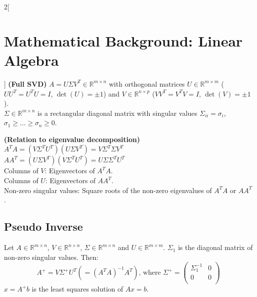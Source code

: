 \documentclass[oneside,fontsize=11pt,paper=a4]{scrartcl}
\begin{document}
\begin{multicols}{2}[\section{Mathematical Background: Linear Algebra}]
\textbf{(Full SVD)}
$A = U \Sigma V^T \in \mathbb{R}^{m \times n}$ with orthogonal matrices $U \in \mathbb{R}^{m \times m}$ ($U U^T = U^T U = I$, $\det(U) = \pm 1$) and $V \in \mathbb{R}^{n \times p}$ ($V V^T = V^T V = I$, $\det(V) = \pm 1$).\\
$\Sigma \in \mathbb{R}^{m \times n}$ is a rectangular diagonal matrix with singular values $\Sigma_{ii} = \sigma_i$, $\sigma_1 \geq ... \geq \sigma_n \geq 0$.\par
\vspace{3mm}

\textbf{(Relation to eigenvalue decomposition)}\\
$A^T A = (V \Sigma^T U^T) (U \Sigma V^T) = V \Sigma^T \Sigma V^T$\\
$A A^T = (U \Sigma V^T) (V \Sigma^T U^T) = U \Sigma \Sigma^T U^T$\\
Columns of $V$: Eigenvectors of $A^T A$. \\
Columns of $U$: Eigenvectors of $A A^T$. \\
Non-zero singular values: Square roots of the non-zero eigenvalues of $A^T A$ or $A A^T$.

\subsection{Pseudo Inverse}
Let $A \in \mathbb{R}^{m \times n}$, $V \in \mathbb{R}^{n \times n}$, $\Sigma \in \mathbb{R}^{m \times n}$ and $U \in \mathbb{R}^{m \times m}$.
$\Sigma_1$ is the diagonal matrix of non-zero singular values.
Then:
\begin{equation*}
    A^+ = V \Sigma^+ U^T (= (A^T A)^{-1} A^T) \text{, where } \Sigma^+ = \begin{pmatrix} \Sigma_1^{-1} & 0\\ 0&0\\ \end{pmatrix}
\end{equation*}
$x = A^+ b$ is the least squares solution of $Ax = b$.
\end{multicols}

\newpage
\end{document}
